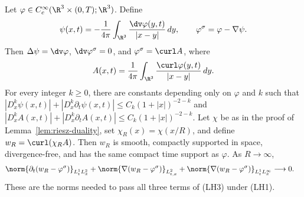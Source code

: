 \documentclass[11pt,reqno]{amsart}
\begin{document}
\begin{lemma}
\label{lem:helmholtz-test}
Let $\varphi\in C_c^\infty(\R^3\times(0,T);\R^3)$. Define
\begin{equation}\label{eq:helmholtz-potential}
\psi(x,t)=-\frac1{4\pi}\int_{\R^3}
\frac{\dv\varphi(y,t)}{|x-y|}\,dy,
\qquad \varphi^\sigma=\varphi-\nabla\psi.
\end{equation}
Then $\Delta\psi=\dv\varphi$, $\dv\varphi^\sigma=0$, and
$\varphi^\sigma=\curl A$, where
\begin{equation}\label{eq:helmholtz-vector-potential}
A(x,t)=\frac1{4\pi}\int_{\R^3}
\frac{\curl\varphi(y,t)}{|x-y|}\,dy.
\end{equation}
For every integer $k\ge0$, there are constants depending only on
$\varphi$ and $k$ such that
$|D_x^k\psi(x,t)|+|D_x^k\partial_t\psi(x,t)|\le
C_k(1+|x|)^{-2-k}$ and
$|D_x^k A(x,t)|+|D_x^k\partial_tA(x,t)|\le
C_k(1+|x|)^{-2-k}$. Let $\chi$ be as in the proof of
Lemma~\ref{lem:riesz-duality}, set $\chi_R(x)=\chi(x/R)$, and define
$w_R=\curl(\chi_RA)$. Then $w_R$ is smooth, compactly supported in space,
divergence-free, and has the same compact time support as $\varphi$. As
$R\to\infty$,
\begin{equation}\label{eq:helmholtz-cutoff-norms}
\begin{aligned}
&\norm{\partial_t(w_R-\varphi^\sigma)}_{L^1_tL^2_x}
+\norm{\nabla(w_R-\varphi^\sigma)}_{L^2_{t,x}}
+\norm{\nabla(w_R-\varphi^\sigma)}_{L^1_tL^\infty_x}
\longrightarrow 0.
\end{aligned}
\end{equation}
These are the norms needed to pass all three terms of (LH3) under (LH1).
\end{lemma}
\end{document}
